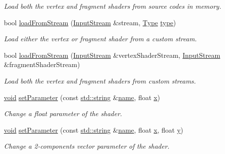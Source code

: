 \begin{DoxyCompactItemize}
\begin{DoxyCompactList}\small\item\em Load both the vertex and fragment shaders from source codes in memory. \end{DoxyCompactList}\item 
bool \hyperlink{classsf_1_1_shader_a2ee1b130c0606e4f8bcdf65c1efc2a53}{load\-From\-Stream} (\hyperlink{classsf_1_1_input_stream}{Input\-Stream} \&stream, \hyperlink{classsf_1_1_shader_afaa1aa65e5de37b74d047da9def9f9b3}{Type} \hyperlink{gl3_8h_a984aabed544368e7fe0e566d7cf014a7}{type})
\begin{DoxyCompactList}\small\item\em Load either the vertex or fragment shader from a custom stream. \end{DoxyCompactList}\item 
bool \hyperlink{classsf_1_1_shader_a3b7958159ffb5596c4babc3052e35465}{load\-From\-Stream} (\hyperlink{classsf_1_1_input_stream}{Input\-Stream} \&vertex\-Shader\-Stream, \hyperlink{classsf_1_1_input_stream}{Input\-Stream} \&fragment\-Shader\-Stream)
\begin{DoxyCompactList}\small\item\em Load both the vertex and fragment shaders from custom streams. \end{DoxyCompactList}\item 
\hyperlink{glutf90_8h_ac778d6f63f1aaf8ebda0ce6ac821b56e}{void} \hyperlink{classsf_1_1_shader_a47e4dd78f0752ae08664b4ee616db1cf}{set\-Parameter} (const \hyperlink{gl3_8h_ac83513893df92266f79a515488701770}{std\-::string} \&\hyperlink{gl3_8h_aaced7cfc21e7d37775d6921bb8177239}{name}, float \hyperlink{gl3_8h_a92d0386e5c19fb81ea88c9f99644ab1d}{x})
\begin{DoxyCompactList}\small\item\em Change a float parameter of the shader. \end{DoxyCompactList}\item 
\hyperlink{glutf90_8h_ac778d6f63f1aaf8ebda0ce6ac821b56e}{void} \hyperlink{classsf_1_1_shader_ab8d379f40810b8e3eadebee81aedd231}{set\-Parameter} (const \hyperlink{gl3_8h_ac83513893df92266f79a515488701770}{std\-::string} \&\hyperlink{gl3_8h_aaced7cfc21e7d37775d6921bb8177239}{name}, float \hyperlink{gl3_8h_a92d0386e5c19fb81ea88c9f99644ab1d}{x}, float \hyperlink{gl3_8h_a66ddd433d2cacfe27f5906b7e86faeed}{y})
\begin{DoxyCompactList}\small\item\em Change a 2-\/components vector parameter of the shader. \end{DoxyCompactList}\item 

\end{DoxyCompactItemize}
